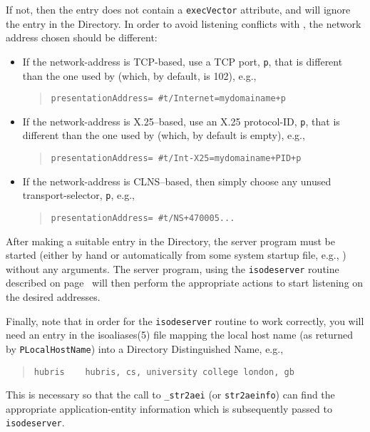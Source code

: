 If not,
then the entry does not contain a \verb"execVector" attribute,
and  will ignore the entry in the Directory.
In order to avoid listening conflicts with ,
the network address chosen should be different:
\begin{itemize}
\item	If the network-address is TCP-based,
	use a TCP port, \verb"p", that is different than
	the one used by  (which, by default, is 102), e.g.,
\begin{quote}\small\begin{verbatim}
presentationAddress= #t/Internet=mydomainame+p
\end{verbatim}\end{quote}

\item	If the network-address is X.25--based,
	use an X.25 protocol-ID, \verb"p", that is different than
	the one used by  (which, by default is empty), e.g.,
\begin{quote}\small\begin{verbatim}
presentationAddress= #t/Int-X25=mydomainame+PID+p
\end{verbatim}\end{quote}

\item	If the network-address is CLNS--based,
	then simply choose any unused transport-selector, \verb"p", e.g.,
\begin{quote}\small\begin{verbatim}
presentationAddress= #t/NS+470005...
\end{verbatim}\end{quote}
\end{itemize}
After making a suitable entry in the Directory,
the server program must be started
(either by hand or automatically from some system startup file,
e.g., ) without any arguments.
The server program,
using the \verb"isodeserver" routine described on page~\pageref{isodeserver}
will then perform the appropriate actions to start listening on the desired
addresses.

Finally,
note that in order for the \verb"isodeserver" routine to work correctly,
you will need an entry in the \man isoaliases(5) file mapping
the local host name (as returned by \verb"PLocalHostName")
into a Directory Distinguished Name, e.g.,
\begin{quote}\small\begin{verbatim}
hubris    hubris, cs, university college london, gb
\end{verbatim}\end{quote}
This is necessary so that the call to \verb"_str2aei" (or \verb"str2aeinfo")
can find the appropriate application-entity information which is subsequently
passed to \verb"isodeserver".
